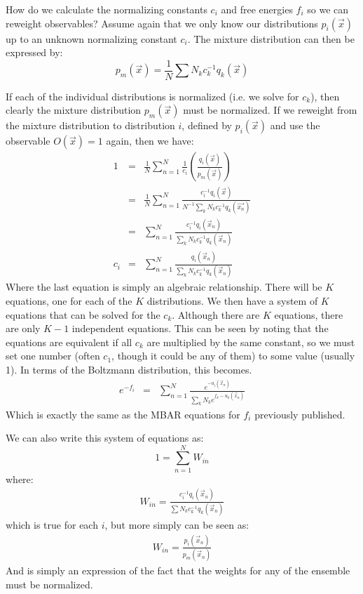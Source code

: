 \documentclass[aps,pre,twocolumn,superscriptaddress]{revtex4-1}
\begin{document}
How do we calculate the normalizing constants $c_i$ and free energies
$f_i$ so we can reweight observables? Assume again that we only know
our distributions $p_i(\vec{x})$ up to an unknown normalizing constant
$c_i$. The mixture distribution can then be expressed by:
\[ p_m(\vec{x}) = \frac{1}{N}\sum N_k c_k^{-1} q_k(\vec{x}) \]

If each of the individual distributions is normalized (i.e. we solve
for $c_k$), then clearly the mixture distribution $p_m(\vec{x})$ must
be normalized.  If we reweight from the mixture distribution to
distribution $i$, defined by $p_i(\vec{x})$ and use the observable
$O(\vec{x}) = 1$ again, then we have:
\begin{eqnarray} 
  1  &=& \frac{1}{N} \sum_{n=1}^{N}\frac{1}{c_i} \left(\frac{q_i(\vec{x})}{p_m(\vec{x})}\right) \nonumber \\
     &=& \frac{1}{N} \sum_{n=1}^N\frac{c_i^{-1} q_i(\vec{x})}{N^{-1}\sum_k N_k c_k^{-1} q_k(\vec{x_n})} \nonumber \\
     &=& \sum_{n=1}^N \frac{c_i^{-1} q_i(\vec{x}_n)}{\sum_k N_k c_k^{-1} q_k(\vec{x}_n)} \nonumber\\
c_i  &=& \sum_{n=1}^N \frac{q_i(\vec{x}_n)}{\sum_k N_k c_k^{-1} q_k(\vec{x}_n)}
\end{eqnarray}
Where the last equation is simply an algebraic relationship.  There
will be $K$ equations, one for each of the $K$
distributions.  We then have a system of $K$ equations that can be
solved for the $c_k$.  Although there are $K$ equations, there are
only $K-1$ independent equations. This can be seen by noting that the
equations are equivalent if all $c_k$ are multiplied by the same
constant, so we must set one number (often $c_1$, though it could be
any of them) to some value (usually 1). In terms of the Boltzmann
distribution, this becomes.
\begin{eqnarray*}
e^{-f_i}  &=& \sum_{n=1}^N \frac{e^{-u_i(\vec{x}_n)}}{\sum_k N_k e^{f_k - u_k(\vec{x}_n)}}
\end{eqnarray*}
Which is exactly the same as the MBAR equations for $f_i$ previously
published.

We can also write this system of equations as:
\begin{equation*}
1 = \sum_{n=1}^N W_{in}
\end{equation*} 
where: 
\begin{eqnarray*}
W_{in} = \frac{c_i^{-1} q_i(\vec{x}_n)}{\sum N_k c_k^{-1} q_k(\vec{x}_n)} 
\end{eqnarray*}
which is true for each $i$, but more simply can be seen as:
\begin{eqnarray}
W_{in} = \frac{p_i(\vec{x}_n)}{p_m(\vec{x}_n)}
\end{eqnarray}
And is simply an expression of the fact that the weights for any of
the ensemble must be normalized.
\end{document}
